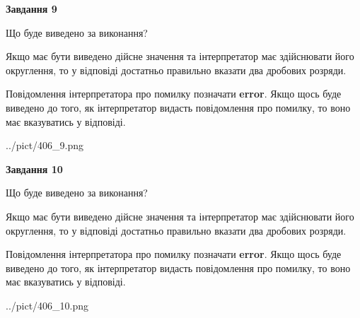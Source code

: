 \documentclass[12pt, ukrainian]{article}
\begin{document}
{\begin {Large}
{\begin {center}\textbf{Завдання 9}\end {center}}\par
Що буде виведено за виконання? \par

Якщо має бути виведено дійсне значення та інтерпретатор має здійснювати його округлення, 
то у відповіді достатньо правильно вказати два дробових розряди.

Повідомлення інтерпретатора про помилку позначати \textbf{error}.
Якщо щось буде виведено до того, як інтерпретатор видасть повідомлення про помилку, 
то воно має вказуватись у відповіді. \par

\begin{center}
	{../pict/406_9.png}
\end{center}
\newpage

{\begin {center}\textbf{Завдання 10}\end {center}}\par
Що буде виведено за виконання? \par

Якщо має бути виведено дійсне значення та інтерпретатор має здійснювати його округлення, 
то у відповіді достатньо правильно вказати два дробових розряди.

Повідомлення інтерпретатора про помилку позначати \textbf{error}.
Якщо щось буде виведено до того, як інтерпретатор видасть повідомлення про помилку, 
то воно має вказуватись у відповіді. \par

\begin{center}
	{../pict/406_10.png}
\end{center}
\newpage

\end {Large}}
\end{document}

